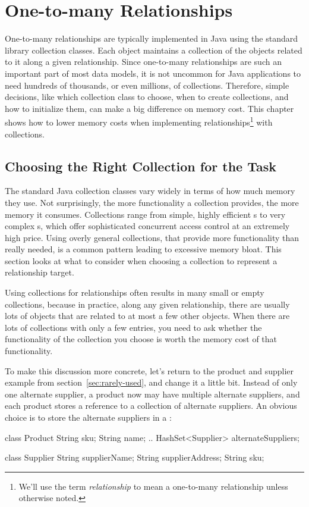 \chapter{One-to-many Relationships}
\label{chapter:representing-relationships}

One-to-many relationships
are typically implemented in Java using the standard library collection classes.
Each object maintains a collection of the objects related to
it along a given relationship. Since one-to-many relationships are such an
important part of most data models, it is not uncommon for Java applications to
need hundreds of thousands, or even millions, of collections.
Therefore, simple decisions, like which collection class to choose,
when to create collections, and how to initialize them,
can make a big difference on memory cost.
This chapter shows how to lower memory costs when implementing
relationships\footnote{We'll use the term \emph{relationship} to
mean a one-to-many relationship unless otherwise noted.} with collections.
 
 \section{Choosing the Right Collection for the Task}
 \label{section:choosing-collection}

The standard Java collection classes vary widely in terms of how much memory they use.
Not surprisingly, the more functionality a collection provides, the more
memory it consumes. Collections range from simple, highly efficient
s to very complex
s, which offer sophisticated concurrent access
control at an extremely high price. 
Using overly general collections, that provide more functionality than
really needed, is a common pattern leading to excessive memory bloat.
This section looks at what to consider when choosing a collection to
represent a relationship target. 

Using collections for relationships often results in many small or
empty collections, because in practice, along any given relationship, there are
usually lots of objects that are related to at most a few other objects. When
there are lots of collections with only a few entries, you need to ask  whether
the functionality of the collection you choose is worth the memory cost of that
functionality.

To make this discussion more concrete, let's return to the product and supplier example 
from section~\ref{sec:rarely-used}, and change it a little
 bit. Instead of only one alternate supplier, a product now may have multiple
 alternate suppliers, and each product stores a reference to a collection of alternate suppliers. An obvious choice is
 to store the alternate suppliers in a :
 \begin{shortlisting} 
class Product {
	String sku;
	String name;
	.. 
	HashSet<Supplier> alternateSuppliers;
}

class Supplier {
	String supplierName;
	String supplierAddress;
	String sku;
}
\end{shortlisting}


